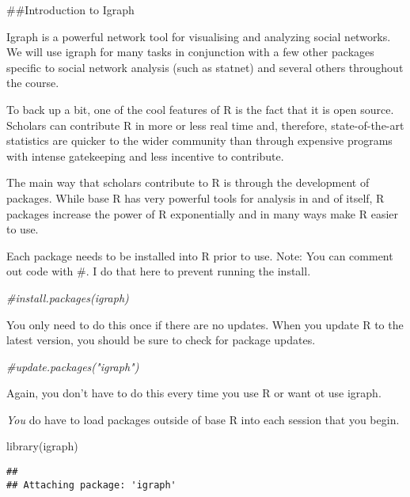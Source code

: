 \documentclass[
]{article}
\newenvironment{Shaded}{\begin{snugshade}}{\end{snugshade}}
\newcommand{\CommentTok}[1]{\textcolor[rgb]{0.56,0.35,0.01}{\textit{#1}}}
\newcommand{\FunctionTok}[1]{\textcolor[rgb]{0.00,0.00,0.00}{#1}}
\newcommand{\NormalTok}[1]{#1}
\begin{document}
\#\#Introduction to Igraph

Igraph is a powerful network tool for visualising and analyzing social
networks. We will use igraph for many tasks in conjunction with a few
other packages specific to social network analysis (such as statnet) and
several others throughout the course.

To back up a bit, one of the cool features of R is the fact that it is
open source. Scholars can contribute R in more or less real time and,
therefore, state-of-the-art statistics are quicker to the wider
community than through expensive programs with intense gatekeeping and
less incentive to contribute.

The main way that scholars contribute to R is through the development of
packages. While base R has very powerful tools for analysis in and of
itself, R packages increase the power of R exponentially and in many
ways make R easier to use.

Each package needs to be installed into R prior to use. Note: You can
comment out code with \#. I do that here to prevent running the install.

\begin{Shaded}
\begin{Highlighting}[]
\CommentTok{\#install.packages(igraph)}
\end{Highlighting}
\end{Shaded}

You only need to do this once if there are no updates. When you update R
to the latest version, you should be sure to check for package updates.

\begin{Shaded}
\begin{Highlighting}[]
\CommentTok{\#update.packages("igraph")}
\end{Highlighting}
\end{Shaded}

Again, you don't have to do this every time you use R or want ot use
igraph.

\emph{You} do have to load packages outside of base R into each session
that you begin.

\begin{Shaded}
\begin{Highlighting}[]
\FunctionTok{library}\NormalTok{(igraph)}
\end{Highlighting}
\end{Shaded}

\begin{verbatim}
## 
## Attaching package: 'igraph'
\end{verbatim}
\end{document}

